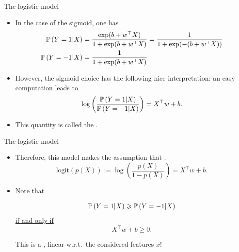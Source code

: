 \documentclass[xcolor={usenames,dvipsnames}]{beamer}
\begin{document}
\begin{frame}{The logistic model}

\begin{itemize}
\item In the case of the sigmoid,
one has
\begin{align*}
\P\left(  Y = 1 | X \right) &= \frac{\exp (b+ w^\top X)}{1+ \exp(b+ w^\top X)} = \frac{1}{1+\exp(-(b+ w^\top X)) } \\
\P\left(  Y = - 1 | X \right) &=  \frac{1}{1+\exp(b+ w^\top X) }
\end{align*}

\item However, the sigmoid choice has the following nice interpretation: an easy computation leads to
$$
\log \left( \frac{\P\left(  Y = 1 | X \right)}{\P\left(  Y = -1 | X  \right)} \right) = X^\top w +b.
$$
\item This quantity is called the .
\end{itemize}
\end{frame}

\begin{frame}{The logistic model}

\begin{itemize}
\item Therefore, this model makes the assumption that :
$$
\mathrm{logit} (p(X)) := \log\left( \frac{p(X)}{1-p(X)} \right) = X^\top w + b.
$$
\pause
\item Note that 
\begin{block}{}
$$
\P\left(  Y = 1 | X \right) \geq \P\left(  Y = -1 | X \right)
$$
\underline{if and only if}
$$
X^\top w + b \geq 0.
$$
\end{block}
\pause
This is a , linear w.r.t.\ the considered features $x$!
\end{itemize}
\end{frame}
\end{document}
